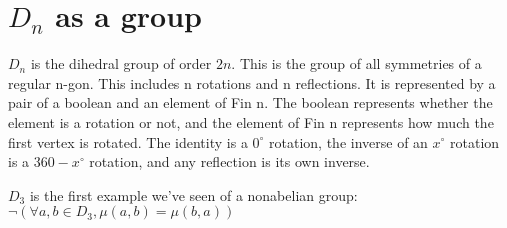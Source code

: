\section{$D_n$ as a group}

\begin{definition}[$D_n$]
    \label{definition : Dn}
    \leanok
    $D_n$ is the dihedral group of order $2n$. This is the group of all
    symmetries of a regular n-gon. This includes n rotations and n reflections.
    It is represented by a pair of a boolean and an element of Fin n. The
    boolean represents whether the element is a rotation or not, and the element
    of Fin n represents how much the first vertex is rotated. The identity is a
    $0 ^{\circ}$ rotation, the inverse of an $x ^{\circ}$ rotation is a $360 - x
    ^{\circ}$ rotation, and any reflection is its own inverse.
\end{definition}

\begin{theorem}[$D_3$ is nonabelian]
    \label{theorem : D3_nonabelian}
    \leanok
    $D_3$ is the first example we've seen of a nonabelian group:
    $\neg (\forall a, b \in D_3, \mu(a, b) = \mu(b, a))$
\end{theorem}
